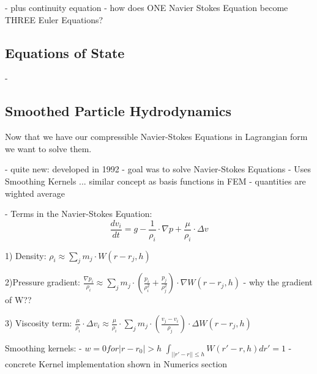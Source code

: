 - plus continuity equation
- how does ONE Navier Stokes Equation become THREE Euler Equations?

\subsection{Equations of State}
-

\subsection{Smoothed Particle Hydrodynamics}
Now that we have our compressible Navier-Stokes Equations in Lagrangian form we want to solve them.

- quite new: developed in 1992
- goal was to solve Navier-Stokes Equations
- Uses Smoothing Kernels ... similar concept as basis functions in FEM
- quantities are wighted average

- Terms in the Navier-Stokes Equation:
\begin{equation} \frac{dv_i}{dt} = g - \frac{1}{\rho_i}\cdot \nabla p + \frac{\mu}{\rho_i} \cdot \Delta  v \end{equation}

1) Density:
$ \rho_i \approx \sum_j m_j \cdot W(r - r_j,h) $

2)Pressure gradient:
$ \frac{\nabla p_i}{\rho_i} \approx \sum_j m_j \cdot (\frac{p_i}{\rho^2_i} + \frac{p_j}{\rho^2_j}) \cdot \nabla W(r - r_j, h) $
- why the gradient of W??

3) Viscosity term:
$ \frac{\mu}{\rho_i} \cdot \Delta v_i \approx \frac{\mu}{\rho_i} \cdot \sum_j m_j \cdot (\frac{v_j - v_i}{\rho_j}) \cdot \Delta W(r - r_j, h) $

Smoothing kernels:
- $ w = 0 for |r - r_0| > h $
$ \int_{||r' - r|| \leq h} W(r' - r, h)dr' = 1 $
- concrete Kernel implementation shown in Numerics section
